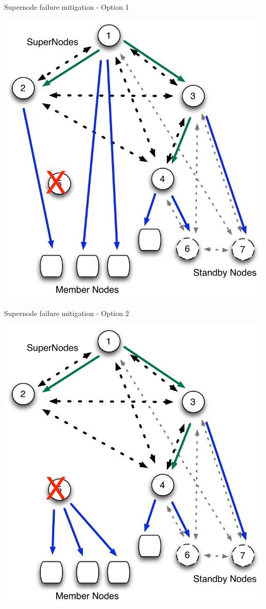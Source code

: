 \documentclass{beamer}
\begin{document}
\begin{frame}{Supernode failure mitigation - Option 1}

\includegraphics[scale=.5]{Node-comm-redist1.pdf}


\end{frame}


\begin{frame}{Supernode failure mitigation - Option 2}

\includegraphics[scale=.5]{Node-comm-trans1.pdf}


\end{frame}
\end{document}

